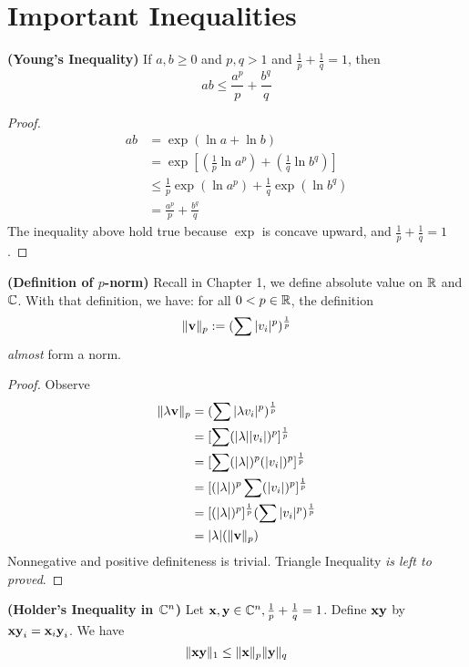 \documentclass{report}
\begin{document}
\section{Important Inequalities}
\begin{theorem}
\label{4.1.1}
\textbf{(Young's Inequality)} If $a,b\geq 0$ and $p,q>1$ and  $\frac{1}{p}+\frac{1}{q}=1$, then
\begin{equation}
ab\leq \frac{a^p}{p}+\frac{b^q}{q}
\end{equation}
\end{theorem}
\begin{proof}
\begin{align}
  ab&=\exp(\ln a+ \ln b)\\
    &=\exp[(\frac{1}{p}\ln a^p)+(\frac{1}{q}\ln b^q)]\\
&\leq \frac{1}{p}\exp(\ln a^p)+\frac{1}{q}\exp(\ln b^q)\\
&= \frac{a^p}{p}+\frac{b^q}{q}
\end{align}
The inequality above hold true because  $\exp$ is concave upward, and $\frac{1}{p}+\frac{1}{q}=1$. 
\end{proof}
\begin{theorem}
\label{4.1.2}
\textbf{(Definition of $p$-norm)} Recall in Chapter 1, we define absolute value on $\mathbb{R}$ and  $\mathbb{C}$. With that definition, we have: for all $0<p \in \mathbb{R}$, the definition
\begin{equation}
  \| \textbf{v} \|_p:= (\sum |v_i|^p)^{\frac{1}{p}}
\end{equation}
\textit{almost} form a norm.
\end{theorem}
\begin{proof}
Observe 
\begin{align}
\| \lambda \textbf{v} \|_p&=(\sum |\lambda v_i|^p)^{\frac{1}{p}} \\
&=[\sum (|\lambda ||v_i|)^p]^{\frac{1}{p}}\\
&=[\sum (|\lambda |)^p(|v_i|)^p]^{\frac{1}{p}}\\
&=[(|\lambda |)^p\sum (|v_i|)^p]^{\frac{1}{p}}\\
&=[(|\lambda |)^p]^{\frac{1}{p}}(\sum |v_i|^p)^{\frac{1}{p}}\\
&=|\lambda |(\| \textbf{v} \|_p)
\end{align}
Nonnegative and positive definiteness is trivial. Triangle Inequality \textit{is left to proved}. 
\end{proof}
\begin{theorem}
\label{4.1.3}
\textbf{(Holder's Inequality in $\mathbb{C}^n$)} Let $\textbf{x},\textbf{y}\in \mathbb{C}^n,\frac{1}{p}+\frac{1}{q}=1$. Define $\textbf{xy}$ by $\textbf{xy}_i=\textbf{x}_i\textbf{y}_i$. We have
\begin{equation}
\| \textbf{xy} \|_1\leq \| \textbf{x} \|_p\| \textbf{y} \|_q
\end{equation}
\end{theorem}
\end{document}
